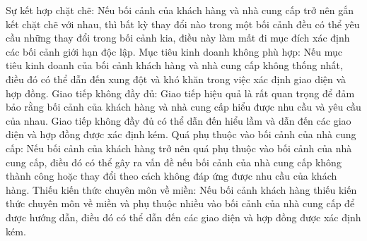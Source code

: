 Sự kết hợp chặt chẽ: Nếu bối cảnh của khách hàng và nhà cung cấp trở nên gắn kết chặt chẽ với nhau, thì bất kỳ thay đổi nào trong một bối cảnh đều có thể yêu cầu những thay đổi trong bối cảnh kia, điều này làm mất đi mục đích xác định các bối cảnh giới hạn độc lập.
Mục tiêu kinh doanh không phù hợp: Nếu mục tiêu kinh doanh của bối cảnh khách hàng và nhà cung cấp không thống nhất, điều đó có thể dẫn đến xung đột và khó khăn trong việc xác định giao diện và hợp đồng.
Giao tiếp không đầy đủ: Giao tiếp hiệu quả là rất quan trọng để đảm bảo rằng bối cảnh của khách hàng và nhà cung cấp hiểu được nhu cầu và yêu cầu của nhau. Giao tiếp không đầy đủ có thể dẫn đến hiểu lầm và dẫn đến các giao diện và hợp đồng được xác định kém.
Quá phụ thuộc vào bối cảnh của nhà cung cấp: Nếu bối cảnh của khách hàng trở nên quá phụ thuộc vào bối cảnh của nhà cung cấp, điều đó có thể gây ra vấn đề nếu bối cảnh của nhà cung cấp không thành công hoặc thay đổi theo cách không đáp ứng được nhu cầu của khách hàng.
Thiếu kiến thức chuyên môn về miền: Nếu bối cảnh khách hàng thiếu kiến thức chuyên môn về miền và phụ thuộc nhiều vào bối cảnh của nhà cung cấp để được hướng dẫn, điều đó có thể dẫn đến các giao diện và hợp đồng được xác định kém.

